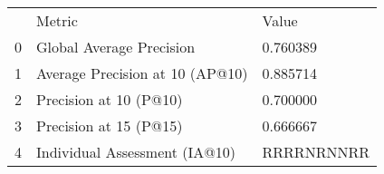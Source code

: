 \begin{tabular}{lll}
 & Metric & Value \\
0 & Global Average Precision & 0.760389 \\
1 & Average Precision at 10 (AP@10) & 0.885714 \\
2 & Precision at 10 (P@10) & 0.700000 \\
3 & Precision at 15 (P@15) & 0.666667 \\
4 & Individual Assessment (IA@10) & RRRRNRNNRR \\
\end{tabular}
